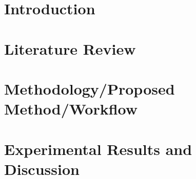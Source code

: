 \documentclass[12pt, a4paper]{report}
\begin{document}

\pagebreak



\pagebreak


\pagebreak



\pagebreak

\renewcommand{\contentsname}{Table of Contents}
\tableofcontents

\clearpage 
\setcounter{figure}{0}
\listoffigures

\clearpage 
{}
\listoftables
 

\clearpage




\chapter{Introduction}\label{chapter:chapter1}
\setcounter{page}{0}


\chapter{Literature Review}


\chapter{Methodology/Proposed Method/Workflow}


\chapter{Experimental Results and Discussion}



\pagebreak
{}
{}
\nocite{*}
\printbibliography
\pagebreak
{}
\end{document}
